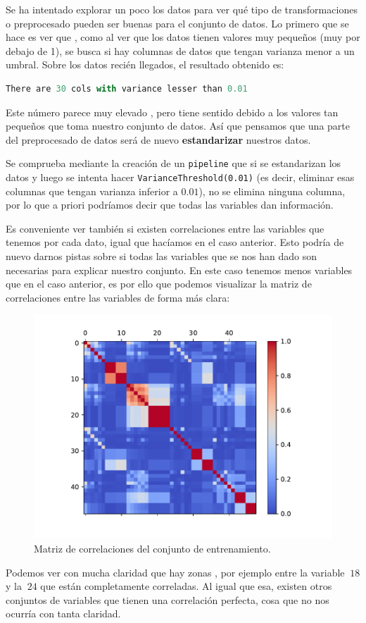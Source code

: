 \documentclass[a4paper, 20pt]{article}
\begin{document}
Se ha intentado explorar un poco los datos para ver qué tipo de transformaciones o preprocesado pueden ser buenas para el conjunto de datos. Lo primero que se hace es ver que , como al ver que los datos tienen valores muy pequeños (muy por debajo de 1), se busca si hay columnas de datos que tengan varianza menor a un umbral. Sobre los datos recién llegados, el resultado obtenido es:
\begin{lstlisting}[language=Python]
  There are 30 cols with variance lesser than 0.01
\end{lstlisting}
Este número parece muy elevado , pero tiene sentido debido a los valores tan pequeños que toma nuestro conjunto de datos. Así que pensamos que una parte del preprocesado de datos será de nuevo \textbf{estandarizar} nuestros datos.

Se comprueba mediante la creación de un \lstinline{pipeline} que si se estandarizan los datos y luego se intenta hacer \lstinline{VarianceThreshold(0.01)} (es decir, eliminar esas columnas que tengan varianza inferior a $0.01$), no se elimina ninguna columna, por lo que a priori podríamos decir que todas las variables dan información.

Es conveniente ver también si existen correlaciones entre las variables que tenemos por cada dato, igual que hacíamos en el caso anterior. Esto podría de nuevo darnos pistas sobre si todas las variables que se nos han dado son necesarias para explicar nuestro conjunto. En este caso tenemos menos variables que en el caso anterior, es por ello que podemos visualizar la matriz de correlaciones entre las variables de forma más clara:

\begin{figure}[H]
  \centering
  \includegraphics[width=0.55\linewidth]{media/corr-standarized-classification.pdf}
  \caption{Matriz de correlaciones del conjunto de entrenamiento. }
  \label{fig:corr-class}
\end{figure}

Podemos ver con mucha claridad que hay zonas , por ejemplo entre la variable $~18$ y la $~24$ que están completamente correladas. Al igual que esa, existen otros conjuntos de variables que tienen una correlación perfecta, cosa que no nos ocurría con tanta claridad.
\end{document}
